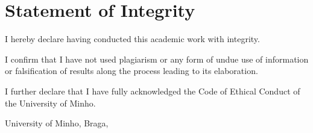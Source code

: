 \chapter*{Statement of Integrity}
\noindent
I hereby declare having conducted this academic work with integrity.

\noindent
I confirm that I have not used plagiarism or any form of undue use of information or falsification of results along the process leading to its elaboration.

\noindent
I further declare that I have fully acknowledged the Code of Ethical Conduct of the University of Minho.

\phantom{space}

\noindent
University of Minho, Braga, \myear

\vspace{25mm}
\noindent \thethesisauthor